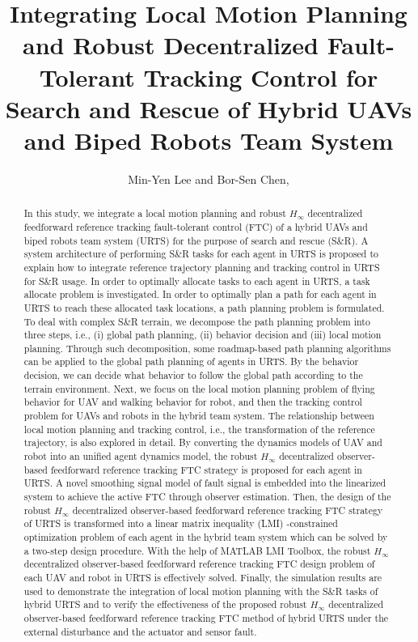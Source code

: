 \documentclass[journal,12pt,onecolumn,draftclsnofoot,]{IEEEtran}
\title{Integrating Local Motion Planning and Robust Decentralized Fault-Tolerant Tracking Control for Search and Rescue of Hybrid UAVs and Biped Robots Team System}
\author{Min-Yen Lee and Bor-Sen Chen, \IEEEmembership{Life Fellow, IEEE,}}
\begin{document}
\maketitle

\begin{abstract}
In this study, we integrate a local motion planning and robust $H_\infty$ decentralized feedforward reference tracking fault-tolerant control (FTC) of a hybrid UAVs and biped robots team system (URTS) for the purpose of search and rescue (S\&R). A system architecture of performing S\&R tasks for each agent in URTS is proposed to explain how to integrate reference trajectory planning and tracking control in URTS for S\&R usage. In order to optimally allocate tasks to each agent in URTS, a task allocate problem is investigated. In order to optimally plan a path for each agent in URTS to reach these allocated task locations, a path planning problem is formulated. To deal with complex S\&R terrain, we decompose the path planning problem into three steps, i.e., (i) global path planning, (ii) behavior decision and (iii) local motion planning. Through such decomposition, some roadmap-based path planning algorithms can be applied to the global path planning of agents in URTS. By the behavior decision, we can decide what behavior to follow the global path according to the terrain environment. Next, we focus on the local motion planning problem of flying behavior for UAV and walking behavior for robot, and then the tracking control problem for UAVs and robots in the hybrid team system. The relationship between local motion planning and tracking control, i.e., the transformation of the reference trajectory, is also explored in detail. By converting the dynamics models of UAV and robot into an unified agent dynamics model, the robust $H_\infty$ decentralized observer-based feedforward reference tracking FTC strategy is proposed for each agent in URTS. A novel smoothing signal model of fault signal is embedded into the linearized system to achieve the active FTC through observer estimation. Then, the design of the robust $H_\infty$ decentralized observer-based feedforward reference tracking FTC strategy of URTS is transformed into a linear matrix inequality (LMI) -constrained optimization problem of each agent in the hybrid team system which can be solved by a two-step design procedure. With the help of MATLAB LMI Toolbox, the robust $H_\infty$ decentralized observer-based feedforward reference tracking FTC design problem of each UAV and robot in URTS is effectively solved. Finally, the simulation results are used to demonstrate the integration of local motion planning with the S\&R tasks of hybrid URTS and to verify the effectiveness of the proposed robust $H_\infty$ decentralized observer-based feedforward reference tracking FTC method of hybrid URTS under the external disturbance and the actuator and sensor fault.
\end{abstract}
\end{document}
